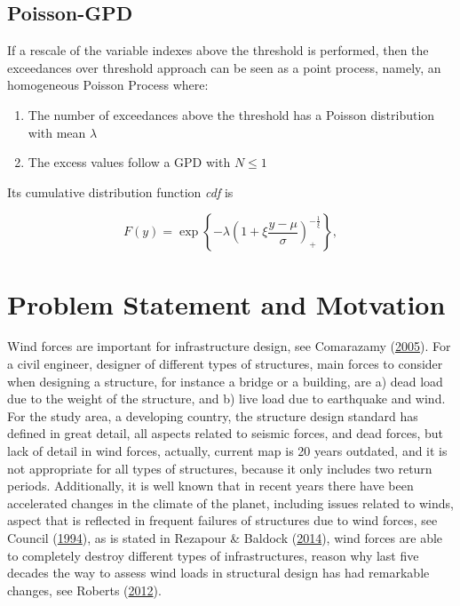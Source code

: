 \documentclass[12pt,oneside]{reedthesis}
\providecommand{\tightlist}{%
  \setlength{\itemsep}{0pt}\setlength{\parskip}{0pt}}
\begin{document}
\hypertarget{poisson-gpd}{%
\subsection{Poisson-GPD}\label{poisson-gpd}}

If a rescale of the variable indexes above the threshold is performed, then the exceedances over threshold approach can be seen as a point process, namely, an homogeneous Poisson Process where:
\begin{enumerate}
\def\labelenumi{\arabic{enumi}.}
\tightlist
\item
  The number of exceedances above the threshold has a Poisson distribution with mean \(\lambda\)
\item
  The excess values follow a GPD with \(N\leq1\)
\end{enumerate}
Its cumulative distribution function \emph{cdf} is

\[
F(y) = \exp\left\{-\lambda\left(1+\xi\frac{y-\mu}{\sigma}\right)_+^{-\frac{1}{\xi}}\right\},
\]

\hypertarget{problem-statement-and-motvation}{%
\section{Problem Statement and Motvation}\label{problem-statement-and-motvation}}

Wind forces are important for infrastructure design, see Comarazamy (\protect\hyperlink{ref-windeffects}{2005}). For a civil engineer, designer of different types of structures, main forces to consider when designing a structure, for instance a bridge or a building, are a) dead load due to the weight of the structure, and b) live load due to earthquake and wind. For the study area, a developing country, the structure design standard has defined in great detail, all aspects related to seismic forces, and dead forces, but lack of detail in wind forces, actually, current map is 20 years outdated, and it is not appropriate for all types of structures, because it only includes two return periods. Additionally, it is well known that in recent years there have been accelerated changes in the climate of the planet, including issues related to winds, aspect that is reflected in frequent failures of structures due to wind forces, see Council (\protect\hyperlink{ref-winddamage}{1994}), as is stated in Rezapour \& Baldock (\protect\hyperlink{ref-Rezapour2014}{2014}), wind forces are able to completely destroy different types of infrastructures, reason why last five decades the way to assess wind loads in structural design has had remarkable changes, see Roberts (\protect\hyperlink{ref-Roberts2012}{2012}).
\end{document}
